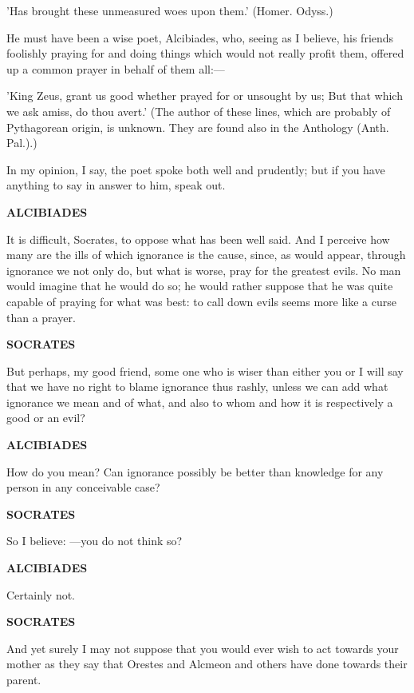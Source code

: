 \documentclass[11pt,letter]{article}
\begin{document}
\par  'Has brought these unmeasured woes upon them.' (Homer. Odyss.)

\par  He must have been a wise poet, Alcibiades, who, seeing as I believe, his friends foolishly praying for and doing things which would not really profit them, offered up a common prayer in behalf of them all:—

\par  'King Zeus, grant us good whether prayed for or unsought by us; But that which we ask amiss, do thou avert.' (The author of these lines, which are probably of Pythagorean origin, is unknown. They are found also in the Anthology (Anth. Pal.).)

\par  In my opinion, I say, the poet spoke both well and prudently; but if you have anything to say in answer to him, speak out.

\par \textbf{ALCIBIADES}
\par   It is difficult, Socrates, to oppose what has been well said. And I perceive how many are the ills of which ignorance is the cause, since, as would appear, through ignorance we not only do, but what is worse, pray for the greatest evils. No man would imagine that he would do so; he would rather suppose that he was quite capable of praying for what was best:  to call down evils seems more like a curse than a prayer.

\par \textbf{SOCRATES}
\par   But perhaps, my good friend, some one who is wiser than either you or I will say that we have no right to blame ignorance thus rashly, unless we can add what ignorance we mean and of what, and also to whom and how it is respectively a good or an evil?

\par \textbf{ALCIBIADES}
\par   How do you mean? Can ignorance possibly be better than knowledge for any person in any conceivable case?

\par \textbf{SOCRATES}
\par   So I believe: —you do not think so?

\par \textbf{ALCIBIADES}
\par   Certainly not.

\par \textbf{SOCRATES}
\par   And yet surely I may not suppose that you would ever wish to act towards your mother as they say that Orestes and Alcmeon and others have done towards their parent.
\end{document}
